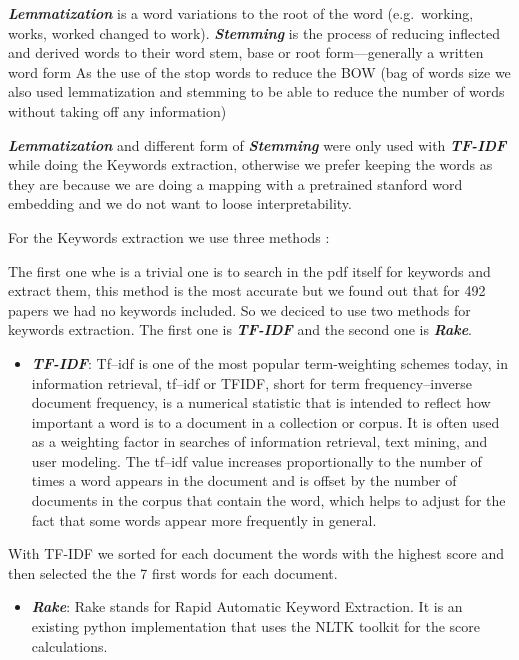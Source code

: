 \documentclass[journal,twocolumn]{IEEEtran}
\providecommand{\tightlist}{%
      \setlength{\itemsep}{0pt}\setlength{\parskip}{0pt}}
\begin{document}
\textbf{\emph{Lemmatization}} is a word variations to the root of the
word (e.g.~working, works, worked changed to work).
\textbf{\emph{Stemming}} is the process of reducing inflected and
derived words to their word stem, base or root form---generally a
written word form As the use of the stop words to reduce the BOW (bag of
words size we also used lemmatization and stemming to be able to reduce
the number of words without taking off any information)

    \textbf{\emph{Lemmatization}} and different form of
\textbf{\emph{Stemming}} were only used with \textbf{\emph{TF-IDF}}
while doing the Keywords extraction, otherwise we prefer keeping the
words as they are because we are doing a mapping with a pretrained
stanford word embedding and we do not want to loose interpretability.

    For the Keywords extraction we use three methods :

The first one whe is a trivial one is to search in the pdf itself for
keywords and extract them, this method is the most accurate but we found
out that for 492 papers we had no keywords included. So we deciced to
use two methods for keywords extraction. The first one is
\textbf{\emph{TF-IDF}} and the second one is \textbf{\emph{Rake}}.

    \begin{itemize}
\tightlist
\item
  \textbf{\emph{TF-IDF}}: Tf--idf is one of the most popular
  term-weighting schemes today, in information retrieval, tf--idf or
  TFIDF, short for term frequency--inverse document frequency, is a
  numerical statistic that is intended to reflect how important a word
  is to a document in a collection or corpus. It is often used as a
  weighting factor in searches of information retrieval, text mining,
  and user modeling. The tf--idf value increases proportionally to the
  number of times a word appears in the document and is offset by the
  number of documents in the corpus that contain the word, which helps
  to adjust for the fact that some words appear more frequently in
  general.
\end{itemize}

    With TF-IDF we sorted for each document the words with the highest score
and then selected the the 7 first words for each document.

    \begin{itemize}
\tightlist
\item
  \textbf{\emph{Rake}}: Rake stands for Rapid Automatic Keyword
  Extraction. It is an existing python implementation that uses the NLTK
  toolkit for the score calculations.
\end{itemize}
\end{document}
